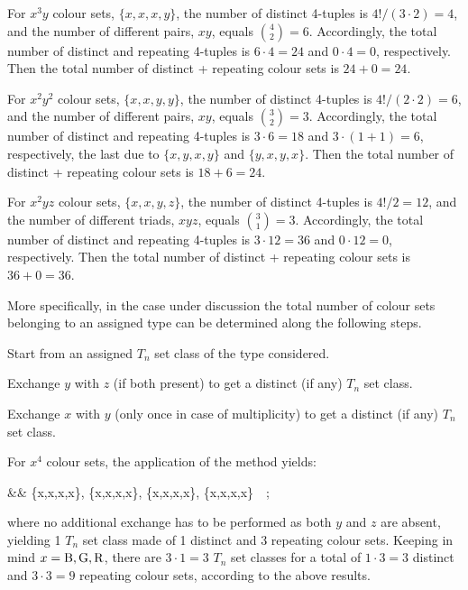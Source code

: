 \documentclass[12pt,a4paper]{article}
\begin{document}
For $x^3y$ colour sets, $\{x,x,x,y\}$, the number of distinct 4-tuples is 
$4!/(3\cdot2)=4$, and the number of different pairs, $xy$, equals
${4\choose2}=6$.   Accordingly, the total number of distinct and repeating
4-tuples is $6\cdot4=24$ and $0\cdot4=0$, respectively.   Then the total
number of distinct + repeating colour sets is $24+0=24$.

For $x^2y^2$ colour sets, $\{x,x,y,y\}$, the number of distinct 4-tuples is 
$4!/(2\cdot2)=6$, and the number of different pairs, $xy$, equals
${3\choose2}=3$.   Accordingly, the total number of distinct and repeating
4-tuples is $3\cdot6=18$ and $3\cdot(1+1)=6$, respectively, the last due to
$\{x,y,x,y\}$ and $\{y,x,y,x\}$.   Then the total number
of distinct + repeating colour sets is $18+6 = 24$.

For $x^2yz$ colour sets, $\{x,x,y,z\}$, the number of distinct 4-tuples is 
$4!/2=12$, and the number of different triads, $xyz$, equals
${3\choose1}=3$.   Accordingly, the total number of distinct and repeating
4-tuples is $3\cdot12=36$ and $0\cdot12=0$, respectively.   Then the total
number of distinct + repeating colour sets is $36+0=36$.

More specifically, in the case under discussion the total number of colour
sets belonging to an assigned type can be determined along the following
steps.

\begin{trivlist}%
\item[\hspace\labelsep{\bf (a)}]
Start from an assigned $T_n$ set class  of the type considered.
\item[\hspace\labelsep{\bf (b)}]
Exchange $y$ with $z$ (if both present) to get a distinct (if any) $T_n$ set
class.
\item[\hspace\labelsep{\bf (c)}]
Exchange $x$ with $y$ (only once in case of multiplicity) to get a distinct
(if any) $T_n$ set class.
\end{trivlist}%
%

For $x^4$ colour sets, the application of the method yields:
\begin{lefteqnarray*}
&& \{x,x,x,x\}, \{x,x,x,x\}, \{x,x,x,x\}, \{x,x,x,x\}~~;
\end{lefteqnarray*}
where no additional exchange has to be performed as both $y$ and $z$ are
absent, yielding 1 $T_n$ set class made of 1 distinct and 3 repeating colour
sets.   Keeping in mind $x={\rm B,G,R}$, there are $3\cdot1=3$ $T_n$ set
classes for a total of $1\cdot3=3$ distinct and $3\cdot3=9$ repeating colour
sets, according to the above results.
\end{document}
